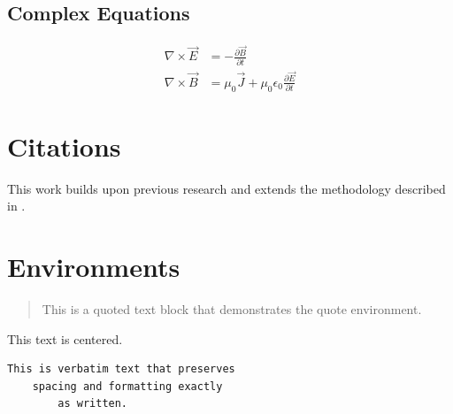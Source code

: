 \documentclass{article}
\begin{document}
\subsection{Complex Equations}

\begin{align}
\nabla \times \vec{E} &= -\frac{\partial \vec{B}}{\partial t} \\
\nabla \times \vec{B} &= \mu_0\vec{J} + \mu_0\epsilon_0\frac{\partial \vec{E}}{\partial t}
\end{align}

\section{Citations}

This work builds upon previous research \cite{example2023} and extends the methodology described in \cite{reference2022}.

\section{Environments}

\begin{quote}
This is a quoted text block that demonstrates the quote environment.
\end{quote}

\begin{center}
This text is centered.
\end{center}

\begin{verbatim}
This is verbatim text that preserves
    spacing and formatting exactly
        as written.
\end{verbatim}
\end{document}
